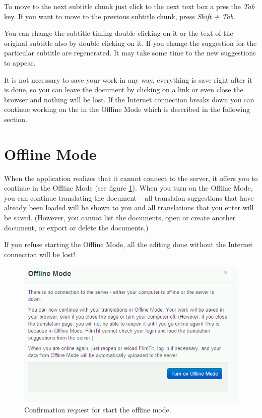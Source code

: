 To move to the next subtitle chunk just click to the next text box a pres the \emph{Tab} key. If you want to move to the previous subtitle chunk, press \emph{Shift + Tab}.

You can change the subtitle timing double clicking on it or the text of the original subtitle also by double clicking on it. If you change the suggestion for the particular subtitle are regenerated. It may take some time to the new suggestions to appear.

It is not necessary to save your work in any way, everything is save right after it is done, so you can leave the document by clicking on a link or even close the browser and nothing will be lost. If the Internet connection breaks down you can continue working on the in the Offline Mode which is described in the following section.

\section{Offline Mode}

When the application realizes that it cannot connect to the server, it offers you to continue in the Offline Mode (see figure \ref{fig:start_offline_mode}). When you turn on the Offline Mode, you can continue translating the document -- all translaion suggestions that have already been loaded will be shown to you and all translations that you enter will be saved.
(However, you cannot list the documents, open or create another document, or export or delete the documents.)


If you refuse starting the Offline Mode, all the editing done without the Internet connection will be lost!

\begin{figure}[h]
\begin{center}
\includegraphics[scale=0.4]{figures/user_manual/offline_mode.png}
\end{center}
\caption{Confirmation request for start the offline mode.}
\label{fig:start_offline_mode}
\end{figure}

